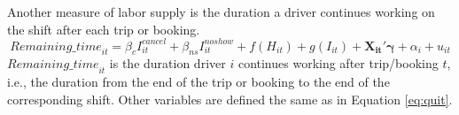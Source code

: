 \documentclass[reviewmode,AEJ]{AEA}
\begin{document}
Another measure of labor supply is the duration a driver continues working on the shift after each trip or booking. 
\begin{equation}
\label{eq:rmins}
{Remaining\_time}_{it} = \beta_c I^{cancel}_{it} + \beta_{ns} I^{noshow}_{it} + f(H_{it}) + g(I_{it}) + \mathbf{X_{it}}'\mathbf{\gamma} + \alpha_i + u_{it}
\end{equation}
${Remaining\_time}_{it}$ is the duration driver $i$ continues working after trip/booking $t$, i.e., the 
duration from the end of the trip or booking to the end of the corresponding shift. %
Other variables are defined the same as in Equation \eqref{eq:quit}.


\end{document}
